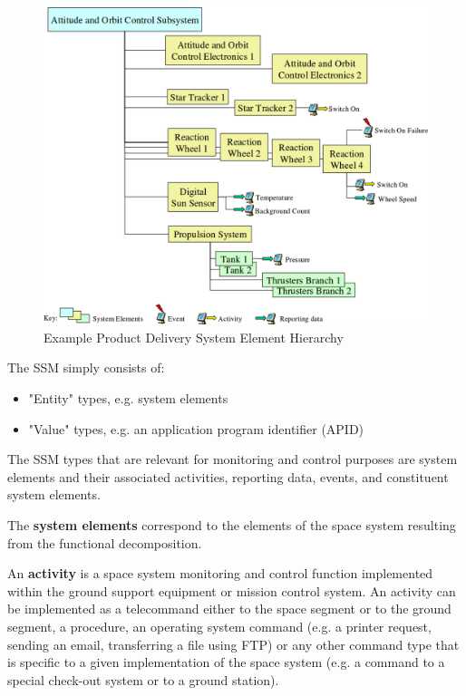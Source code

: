 \begin{figure}[h]
\centering\includegraphics[scale=0.35]{fig/example_product_delivery_system_element_hierarchy}
\caption{Example Product Delivery System Element Hierarchy}
\label{fig:Example Product Delivery System Element Hierarchy}
\end{figure}

The SSM simply consists of:
\begin{itemize}
\item "Entity" types, e.g. system elements
\item "Value" types, e.g. an application program identifier (APID)
\end{itemize}

The SSM types that are relevant for monitoring and control purposes are system elements and their associated activities, reporting data, events, and constituent system elements.

The \textbf{system elements} correspond to the elements of the space system resulting from the functional decomposition.

An \textbf{activity} is a space system monitoring and control function implemented within the ground support equipment or mission control system. An activity can be implemented as a telecommand either to the space segment or to the ground segment, a procedure, an operating system command (e.g. a printer request, sending an email, transferring a file using FTP) or any other command type that is specific to a given implementation of the space system (e.g. a command to a special check-out system or to a ground station).

